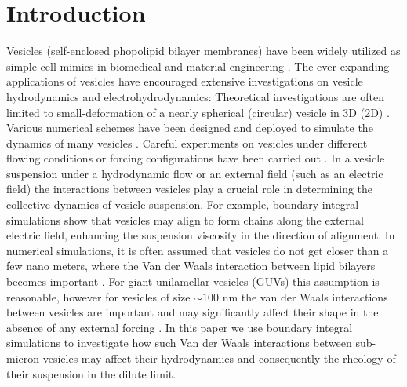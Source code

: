 \documentclass[%
preprint,
 amsmath,amssymb,
 aps,
]{revtex4-1}
\begin{document}

\section{Introduction}
Vesicles (self-enclosed phopolipid bilayer membranes) have been widely utilized
as simple cell mimics in biomedical and material engineering \cite{}. The ever expanding applications of vesicles have encouraged extensive investigations on vesicle hydrodynamics
and electrohydrodynamics: Theoretical investigations are often limited to small-deformation of a nearly spherical (circular) vesicle in 3D (2D) \cite{Barthes-BieselRallison1981_JFM,Misbah2006_PRL,Vlahovska2007_PRE,Finken2008_EPL}. Various numerical schemes have been designed and deployed to simulate the dynamics of many vesicles \cite{BagchiJohoson2005_JBE,Biben2005_EJP,Veerapaneni2009_JCP,SeolHuKimLai2016_JCP}.  Careful experiments on vesicles under different flowing conditions or forcing configurations have been carried out \cite{MaderVitkova2006_EurPhysJE, Abkarian2008_SoftMatt}. In a vesicle suspension under 
a hydrodynamic flow or an external field (such as an electric field) 
the interactions between
vesicles play a crucial role in determining the collective dynamics of
vesicle suspension. For example, boundary integral simulations show that
vesicles may align to form chains along the external electric field,
enhancing the suspension viscosity in the direction of alignment.
In numerical simulations, it is often assumed that vesicles do not get closer than a few nano meters, where the
Van der Waals interaction between lipid bilayers becomes important \cite{EvansMetcalfe1984_BJ,Book_PhysicalBasisCellAdhesion,Book_IntermolecularSurfaceForces}.
For giant unilamellar vesicles (GUVs) this assumption is reasonable, however for vesicles of size $\sim 100$ nm the van der Waals
interactions between vesicles are important and may significantly affect their shape in the absence of any external forcing \cite{RamachandranAndersonLealIsraelachvili2010_Langmuir}. In this paper we use boundary integral simulations to investigate
how such Van der Waals interactions between sub-micron vesicles may affect their hydrodynamics and consequently the rheology 
of their suspension in the dilute limit.
\end{document}
